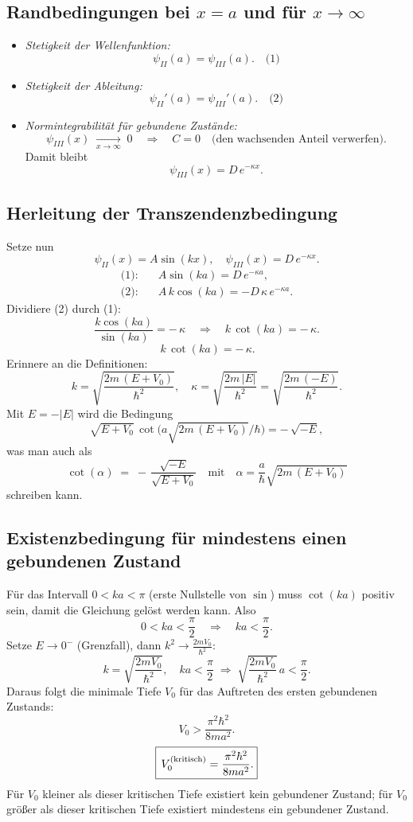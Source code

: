 \documentclass[a4paper,12pt]{article}
\begin{document}
\subsection*{Randbedingungen bei \boldmath $x=a$ und für \boldmath $x\to\infty$}

\begin{itemize}
  \item \emph{Stetigkeit der Wellenfunktion:}
    \[
      \psi_{II}(a) = \psi_{III}(a).
      \quad\text{(1)}
    \]
  \item \emph{Stetigkeit der Ableitung:}
    \[
      \psi_{II}'(a) = \psi_{III}'(a).
      \quad\text{(2)}
    \]
  \item \emph{Normintegrabilität für gebundene Zustände:}
    \[
      \psi_{III}(x)\;\xrightarrow[x\to\infty]{}\;0
      \quad\Longrightarrow\quad C=0
      \quad\text{(den wachsenden Anteil verwerfen).}
    \]
    Damit bleibt
    \[
      \psi_{III}(x)=D\,e^{-\kappa x}.
    \]
\end{itemize}

\subsection*{Herleitung der Transzendenzbedingung}

Setze nun
\[
\psi_{II}(x)=A\sin(kx),\quad
\psi_{III}(x)=D\,e^{-\kappa x}.
\]
\begin{align*}
  \text{(1):}\quad & A\sin(k a) = D\,e^{-\kappa a}, \\
  \text{(2):}\quad & A\,k\cos(k a) = -D\,\kappa\,e^{-\kappa a}.
\end{align*}
Dividiere (2) durch (1):
\[
\frac{k\cos(k a)}{\sin(k a)}
= -\,\kappa
\quad\Longrightarrow\quad
k\,\cot(k a) = -\,\kappa.
\]
\[
\boxed{\,k\,\cot(k a) = -\,\kappa.}
\]
Erinnere an die Definitionen:
\[
k = \sqrt{\frac{2m\,(E+V_0)}{\hbar^2}}, 
\quad
\kappa = \sqrt{\frac{2m\,|E|}{\hbar^2}}
= \sqrt{\frac{2m\,(-E)}{\hbar^2}}.
\]
Mit $E=-|E|$ wird die Bedingung
\[
\sqrt{E+V_0}\,\cot\!\bigl(a\sqrt{2m\,(E+V_0)}/\hbar\bigr)
= -\,\sqrt{-E},
\]
was man auch als
\[
\cot(\alpha)\;=\;-\,\frac{\sqrt{-E}}{\sqrt{E+V_0}}
\quad\text{mit}\quad
\alpha = \frac{a}{\hbar}\sqrt{2m\,(E+V_0)}
\]
schreiben kann.

\subsection*{Existenzbedingung für mindestens einen gebundenen Zustand}

Für das Intervall $0<k a<\pi$ (erste Nullstelle von $\sin$) muss $\cot(k a)$ positiv sein,
damit die Gleichung gelöst werden kann. Also
\[
0 < k a < \frac{\pi}{2}
\quad\Longrightarrow\quad
k a < \frac{\pi}{2}.
\]
Setze $E\to 0^-$ (Grenzfall), dann $k^2 \to \tfrac{2mV_0}{\hbar^2}$:
\[
k = \sqrt{\frac{2mV_0}{\hbar^2}},
\quad
k a < \frac{\pi}{2}
\;\Longrightarrow\;
\sqrt{\frac{2mV_0}{\hbar^2}}\,a < \frac{\pi}{2}.
\]
Daraus folgt die minimale Tiefe $V_0$ für das Auftreten des ersten gebundenen Zustands:
\[
V_0 > \frac{\pi^2\hbar^2}{8 m a^2}.
\]
\[
\boxed{\,V_0^{\rm (kritisch)} = \frac{\pi^2\hbar^2}{8 m a^2}.}
\]
Für $V_0$ kleiner als dieser kritischen Tiefe existiert kein gebundener Zustand; für $V_0$ größer
als dieser kritischen Tiefe existiert mindestens ein gebundener Zustand.
\end{document}
